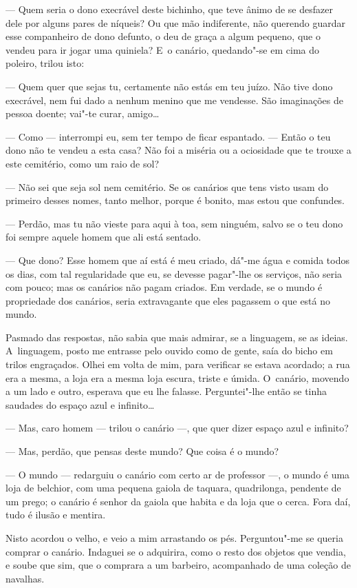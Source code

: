 \begin{linenumbers}
--- Quem seria o dono execrável deste bichinho, que teve ânimo de se
desfazer dele por alguns pares de níqueis? Ou que mão indiferente, não
querendo guardar esse companheiro de dono defunto, o deu de graça a
algum pequeno, que o vendeu para ir jogar uma quiniela? E~o canário,
quedando"-se em cima do poleiro, trilou isto:

--- Quem quer que sejas tu, certamente não estás em teu juízo. Não tive
dono execrável, nem fui dado a nenhum menino que me vendesse. São
imaginações de pessoa doente; vai"-te curar, amigo\ldots{}

--- Como --- interrompi eu, sem ter tempo de ficar espantado. --- Então o
teu dono não te vendeu a esta casa? Não foi a miséria ou a ociosidade
que te trouxe a este cemitério, como um raio de sol?

--- Não sei que seja sol nem cemitério. Se os canários que tens visto
usam do primeiro desses nomes, tanto melhor, porque é bonito, mas estou
que confundes.

--- Perdão, mas tu não vieste para aqui à toa, sem ninguém, salvo se o
teu dono foi sempre aquele homem que ali está sentado.

--- Que dono? Esse homem que aí está é meu criado, dá"-me água e comida
todos os dias, com tal regularidade que eu, se devesse pagar"-lhe os
serviços, não seria com pouco; mas os canários não pagam criados. Em
verdade, se o mundo é propriedade dos canários, seria extravagante que
eles pagassem o que está no mundo.

Pasmado das respostas, não sabia que mais admirar, se a linguagem, se as
ideias. A~linguagem, posto me entrasse pelo ouvido como de gente, saía
do bicho em trilos engraçados. Olhei em volta de mim, para verificar se
estava acordado; a rua era a mesma, a loja era a mesma loja escura,
triste e úmida. O~canário, movendo a um lado e outro, esperava que eu
lhe falasse. Perguntei"-lhe então se tinha saudades do espaço azul e
infinito\ldots{}

--- Mas, caro homem --- trilou o canário ---, que quer dizer espaço azul e
infinito?

--- Mas, perdão, que pensas deste mundo? Que coisa é o mundo?

--- O mundo --- redarguiu o canário com certo ar de professor ---, o mundo
é uma loja de belchior, com uma pequena gaiola de taquara, quadrilonga,
pendente de um prego; o canário é senhor da gaiola que habita e da loja
que o cerca. Fora daí, tudo é ilusão e mentira.

Nisto acordou o velho, e veio a mim arrastando os pés. Perguntou"-me se
queria comprar o canário. Indaguei se o adquirira, como o resto dos
objetos que vendia, e soube que sim, que o comprara a um barbeiro,
acompanhado de uma coleção de navalhas.


\end{linenumbers}

